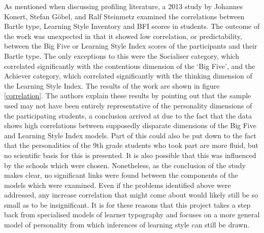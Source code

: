 \documentclass[12pt,a4paper,twoside]{report}
\begin{document}
As mentioned when discussing profiling literature, a 2013 study by Johannes Konert, Stefan G{\"o}bel, and Ralf Steinmetz \cite{konertmodeling} examined the correlations between Bartle type, Learning Style Inventory and BFI scores in students. The outcome of the work was unexpected in that it showed low correlation, or predictability, between the Big Five or Learning Style Index scores of the participants and their Bartle type. The only exceptions to this were the Socialiser category, which correlated significantly with the contentious dimension of the `Big Five', and the Achiever category, which correlated significantly with the thinking dimension of the Learning Style Index. The results of the work are shown in figure \ref{correlation}. The authors explain these results by pointing out that the sample used may not have been entirely representative of the personality dimensions of the participating students, a conclusion arrived at due to the fact that the data shows high correlations between supposedly disparate dimensions of the Big Five and Learning Style Index models. Part of this could also be put down to the fact that the personalities of the 9th grade students who took part are more fluid, but no scientific basis for this is presented. It is also possible that this was influenced by the schools which were chosen. Nonetheless, as the conclusion of the study makes clear, no significant links were found between the components of the models which were examined. Even if the problems identified above were addressed, any increase correlation that might come about would likely still be so small as to be insignificant. It is for these reasons that this project takes a step back from specialised models of learner typography and focuses on a more general model of personality from which inferences of learning style can still be drawn.
\end{document}

